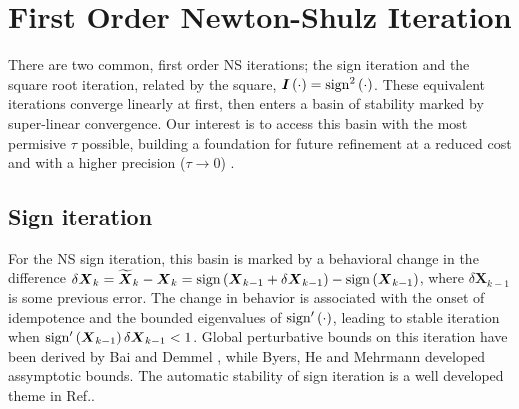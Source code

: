 \documentclass[letterpaper,twocolumn,amsmath,amsfont,amssymb,english,aps,jcp,preprintnumbers,groupaddress,nofootinbib,tightenlines]{revtex4}
\newcommand{\mat}[1]{\boldsymbol{#1}}
\begin{document}
\section{First Order Newton-Shulz Iteration}

There are two common, first order NS iterations; the sign iteration and the square root iteration, related by the square, $\mat{I}\left( \cdot \right)= {\rm sign}^2\left( \cdot \right) $.  These equivalent iterations converge linearly at first, then enters a basin of stability marked by super-linear convergence. 
Our interest is to access this basin with the most permisive $\tau$ possible, building a foundation for future refinement
at a reduced cost and with a higher precision ($\tau \rightarrow 0$) \cite{MChallacombe16}.

\subsection{Sign iteration}
For the NS sign iteration, this basin is marked by a behavioral change in the
difference $\delta \mat{X}_k = \widetilde{\mat{X}}_k -\mat{X}_k = {\rm sign} \left(\mat{X}_{k-1}+\delta \mat{X}_{k-1} \right)
-{\rm sign} \left(\mat{X}_{k-1} \right)$, where $\delta \mat{X}_{k-1}$ is some previous error.
The change in behavior is associated with the onset of idempotence and the bounded eigenvalues of ${\rm sign}'\left( \cdot \right)$, leading to stable 
iteration when ${\rm sign}'\left( \mat{X}_{k-1} \right) \delta \mat{X}_{k-1} < 1 $.  
Global perturbative bounds on this iteration have been derived by Bai and Demmel \cite{Bai98usingthe}, while
Byers, He and Mehrmann \cite{} developed assymptotic bounds.  The automatic stability of sign iteration is a well developed theme in Ref.\cite{Higham08}.
\end{document}

